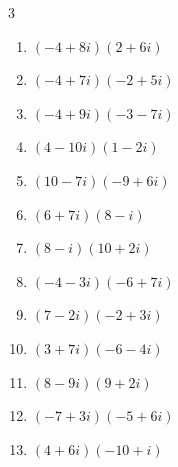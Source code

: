 \begin{multicols}{3}
\begin{enumerate}
        \phantom{$\displaystyle =70+10i$}

  \item $\displaystyle (-4+8i)(2+6i)$

        \phantom{$\displaystyle =-56-8i$}

  \item $\displaystyle (-4+7i)(-2+5i)$

        \phantom{$\displaystyle =-27-34i$}

  \item $\displaystyle (-4+9i)(-3-7i)$

        \phantom{$\displaystyle =75+i$}

  \item $\displaystyle (4-10i)(1-2i)$

        \phantom{$\displaystyle =-16-18i$}

  \item $\displaystyle (10-7i)(-9+6i)$

        \phantom{$\displaystyle =-48+123i$}

  \item $\displaystyle (6+7i)(8-i)$

        \phantom{$\displaystyle =55+50i$}

\columnbreak %

  \item $\displaystyle (8-i)(10+2i)$

        \phantom{$\displaystyle =82+6i$}

  \item $\displaystyle (-4-3i)(-6+7i)$

        \phantom{$\displaystyle =45-10i$}

  \item $\displaystyle (7-2i)(-2+3i)$

        \phantom{$\displaystyle =-8+25i$}

  \item $\displaystyle (3+7i)(-6-4i)$

        \phantom{$\displaystyle =10-54i$}

  \item $\displaystyle (8-9i)(9+2i)$

        \phantom{$\displaystyle =90-65i$}

  \item $\displaystyle (-7+3i)(-5+6i)$

        \phantom{$\displaystyle =17-57i$}

  \item $\displaystyle (4+6i)(-10+i)$


\end{enumerate}
\end{multicols}
